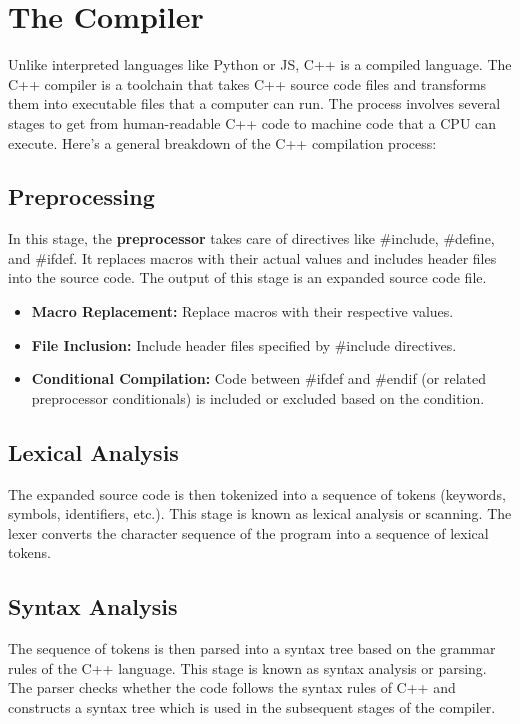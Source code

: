 \documentclass{report}
\begin{document}
    \pagebreak \bigbreak \noindent 
    \section{\LARGE The Compiler}
    \bigbreak \noindent 
    Unlike interpreted languages like Python or JS, C++ is a compiled language. The C++ compiler is a toolchain that takes C++ source code files and transforms them into executable files that a computer can run. The process involves several stages to get from human-readable C++ code to machine code that a CPU can execute.
    \bigbreak \noindent 
    Here's a general breakdown of the C++ compilation process:
    \bigbreak \noindent 
    \subsection{Preprocessing}
    \bigbreak \noindent 
    In this stage, the \textbf{preprocessor} takes care of directives like \#include, \#define, and \#ifdef. It replaces macros with their actual values and includes header files into the source code. The output of this stage is an expanded source code file.
    \begin{itemize}
        \item \textbf{Macro Replacement:} Replace macros with their respective values.
        \item \textbf{File Inclusion:} Include header files specified by \#include directives.
        \item \textbf{Conditional Compilation:} Code between \#ifdef and \#endif (or related preprocessor conditionals) is included or excluded based on the condition.
    \end{itemize}

    \bigbreak \noindent 
    \subsection{Lexical Analysis}
    \bigbreak \noindent 
    The expanded source code is then tokenized into a sequence of tokens (keywords, symbols, identifiers, etc.). This stage is known as lexical analysis or scanning. The lexer converts the character sequence of the program into a sequence of lexical tokens.

    \bigbreak \noindent 
    \subsection{Syntax Analysis}
    \bigbreak \noindent 
    The sequence of tokens is then parsed into a syntax tree based on the grammar rules of the C++ language. This stage is known as syntax analysis or parsing. The parser checks whether the code follows the syntax rules of C++ and constructs a syntax tree which is used in the subsequent stages of the compiler.
\end{document}
